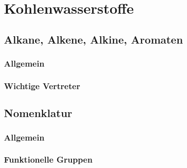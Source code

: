 \section{Kohlenwasserstoffe}

\subsection{Alkane, Alkene, Alkine, Aromaten}

\subsubsection{Allgemein}

\subsubsection{Wichtige Vertreter}

\subsection{Nomenklatur}

\subsubsection{Allgemein}

\subsubsection{Funktionelle Gruppen}
